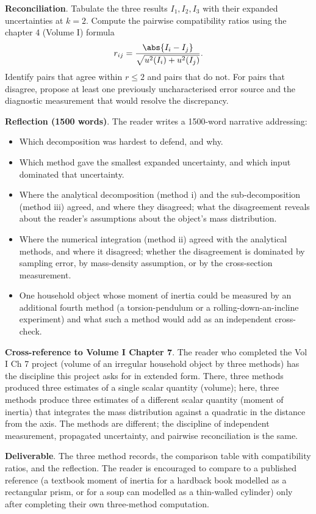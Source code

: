 \begin{project}
\textbf{Reconciliation}. Tabulate the three results $I_{1}, I_{2},
I_{3}$ with their expanded uncertainties at $k = 2$. Compute the
pairwise compatibility ratios using the chapter 4 (Volume I)
formula
\[
r_{ij} = \frac{\abs{I_{i} - I_{j}}}{\sqrt{u^{2}(I_{i}) +
u^{2}(I_{j})}}.
\]
Identify pairs that agree within $r \leq 2$ and pairs that do not.
For pairs that disagree, propose at least one previously
uncharacterised error source and the diagnostic measurement that
would resolve the discrepancy.

\textbf{Reflection (1500 words)}. The reader writes a 1500-word
narrative addressing:

\begin{itemize}[leftmargin=*]
  \item Which decomposition was hardest to defend, and why.
  \item Which method gave the smallest expanded uncertainty, and
    which input dominated that uncertainty.
  \item Where the analytical decomposition (method i) and the
    sub-decomposition (method iii) agreed, and where they
    disagreed; what the disagreement reveals about the reader's
    assumptions about the object's mass distribution.
  \item Where the numerical integration (method ii) agreed with the
    analytical methods, and where it disagreed; whether the
    disagreement is dominated by sampling error, by mass-density
    assumption, or by the cross-section measurement.
  \item One household object whose moment of inertia could be
    measured by an additional fourth method (a torsion-pendulum
    or a rolling-down-an-incline experiment) and what such a
    method would add as an independent cross-check.
\end{itemize}

\textbf{Cross-reference to Volume I Chapter 7}. The reader who
completed the Vol I Ch 7 project (volume of an irregular household
object by three methods) has the discipline this project asks for
in extended form. There, three methods produced three estimates of
a single scalar quantity (volume); here, three methods produce
three estimates of a different scalar quantity (moment of inertia)
that integrates the mass distribution against a quadratic in the
distance from the axis. The methods are different; the discipline
of independent measurement, propagated uncertainty, and pairwise
reconciliation is the same.

\textbf{Deliverable}. The three method records, the comparison
table with compatibility ratios, and the reflection. The reader is
encouraged to compare to a published reference (a textbook moment
of inertia for a hardback book modelled as a rectangular prism,
or for a soup can modelled as a thin-walled cylinder) only after
completing their own three-method computation.


\end{project}

